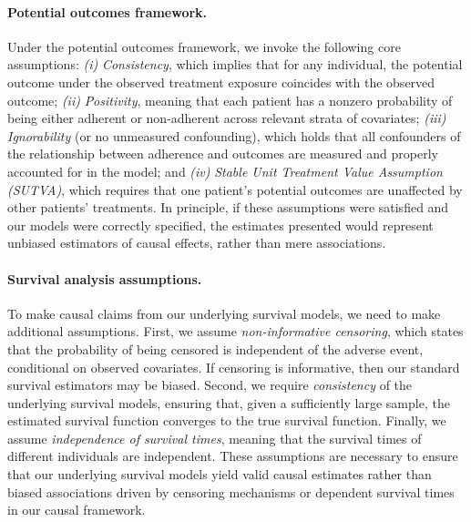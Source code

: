 \paragraph{Potential outcomes framework.} 
Under the potential outcomes framework, we invoke the following core assumptions:
\textit{(i)} \emph{Consistency}, which implies that for any individual, the potential outcome under the observed treatment exposure coincides with the observed outcome;
\textit{(ii)} \emph{Positivity}, meaning that each patient has a nonzero probability of being either adherent or non-adherent across relevant strata of covariates;
\textit{(iii)} \emph{Ignorability} (or no unmeasured confounding), which holds that all confounders of the relationship between adherence and outcomes are measured and properly accounted for in the model; and 
\textit{(iv)} \emph{Stable Unit Treatment Value Assumption (SUTVA)}, which requires that one patient’s potential outcomes are unaffected by other patients’ treatments. 
In principle, if these assumptions were satisfied and our models were correctly specified, the estimates presented would represent unbiased estimators of causal effects, rather than mere associations.

\paragraph{Survival analysis assumptions.}
To make causal claims from our underlying survival models, we need to make additional assumptions.
First, we assume \emph{non-informative censoring}, which states that the probability of being censored is independent of the adverse event, conditional on observed covariates.
If censoring is informative, then our standard survival estimators may be biased.
Second, we require \emph{consistency} of the underlying survival models,  ensuring that, given a sufficiently large sample, the estimated survival function converges to the true survival function.
Finally, we assume \emph{independence of survival times}, meaning that the survival times of different individuals are independent.
These assumptions are necessary to ensure that our underlying survival models yield valid causal estimates rather than biased associations driven by censoring mechanisms or dependent survival times in our causal framework.

